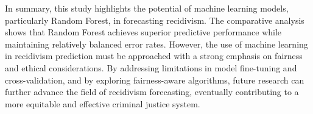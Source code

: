 \documentclass[12pt]{article}
\begin{document}
In summary, this study highlights the potential of machine learning models, particularly Random Forest, in forecasting recidivism. The comparative analysis shows that Random Forest achieves superior predictive performance while maintaining relatively balanced error rates. However, the use of machine learning in recidivism prediction must be approached with a strong emphasis on fairness and ethical considerations. By addressing limitations in model fine-tuning and cross-validation, and by exploring fairness-aware algorithms, future research can further advance the field of recidivism forecasting, eventually contributing to a more equitable and effective criminal justice system.





\end{document}
